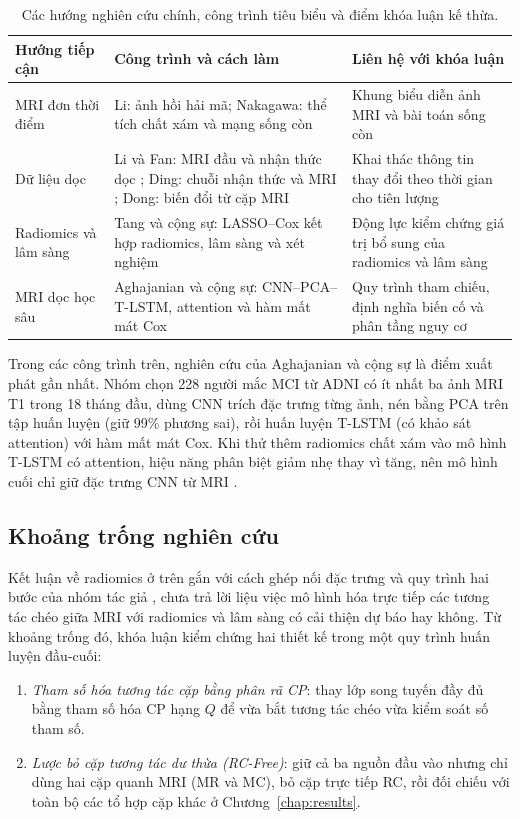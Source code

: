\begin{table}[H]
\centering\small
\renewcommand{\arraystretch}{1.02}
\caption[Tổng hợp nghiên cứu liên quan]{Các hướng nghiên cứu chính, công trình tiêu biểu và điểm khóa luận kế thừa.}
\label{tab:related}
\begin{tabularx}{\linewidth}{@{}L{2.8cm}Y Y@{}}
\toprule
\textbf{Hướng tiếp cận} & \textbf{Công trình và cách làm} & \textbf{Liên hệ với khóa luận} \\
\midrule
MRI đơn thời điểm & Li: ảnh hồi hải mã; Nakagawa: thể tích chất xám và mạng sống còn \cite{li2019hippocampal,nakagawa2020survival} & Khung biểu diễn ảnh MRI và bài toán sống còn \\
Dữ liệu dọc & Li và Fan: MRI đầu và nhận thức dọc \cite{li2019early}; Ding: chuỗi nhận thức và MRI \cite{ding2023progression}; Dong: biến đổi từ cặp MRI \cite{dong2021deepatrophy} & Khai thác thông tin thay đổi theo thời gian cho tiên lượng \\
Radiomics và lâm sàng & Tang và cộng sự: LASSO--Cox kết hợp radiomics, lâm sàng và xét nghiệm \cite{tang2021individualized} & Động lực kiểm chứng giá trị bổ sung của radiomics và lâm sàng \\
MRI dọc học sâu & Aghajanian và cộng sự: CNN--PCA--T-LSTM, attention và hàm mất mát Cox \cite{aghajanian2025longitudinal} & Quy trình tham chiếu, định nghĩa biến cố và phân tầng nguy cơ \\
\bottomrule
\end{tabularx}
\end{table}

Trong các công trình trên, nghiên cứu của Aghajanian và cộng sự \cite{aghajanian2025longitudinal} là điểm xuất phát gần nhất. Nhóm chọn 228 người mắc MCI từ ADNI có ít nhất ba ảnh MRI T1 trong 18 tháng đầu, dùng CNN trích đặc trưng từng ảnh, nén bằng PCA trên tập huấn luyện (giữ 99\% phương sai), rồi huấn luyện T-LSTM (có khảo sát attention) với hàm mất mát Cox. Khi thử thêm radiomics chất xám vào mô hình T-LSTM có attention, hiệu năng phân biệt giảm nhẹ thay vì tăng, nên mô hình cuối chỉ giữ đặc trưng CNN từ MRI \cite{aghajanian2025longitudinal}.

\subsection{Khoảng trống nghiên cứu}
\label{sec:research-gaps}
Kết luận về radiomics ở trên gắn với cách ghép nối đặc trưng và quy trình hai bước của nhóm tác giả \cite{aghajanian2025longitudinal}, chưa trả lời liệu việc mô hình hóa trực tiếp các tương tác chéo giữa MRI với radiomics và lâm sàng có cải thiện dự báo hay không. Từ khoảng trống đó, khóa luận kiểm chứng hai thiết kế trong một quy trình huấn luyện đầu-cuối:
\begin{enumerate}[itemsep=0.1em,topsep=0.2em]
\item \emph{Tham số hóa tương tác cặp bằng phân rã CP}: thay lớp song tuyến đầy đủ bằng tham số hóa CP hạng $Q$ để vừa bắt tương tác chéo vừa kiểm soát số tham số.
\item \emph{Lược bỏ cặp tương tác dư thừa (RC-Free)}: giữ cả ba nguồn đầu vào nhưng chỉ dùng hai cặp quanh MRI (MR và MC), bỏ cặp trực tiếp RC, rồi đối chiếu với toàn bộ các tổ hợp cặp khác ở Chương~\ref{chap:results}.
\end{enumerate}
